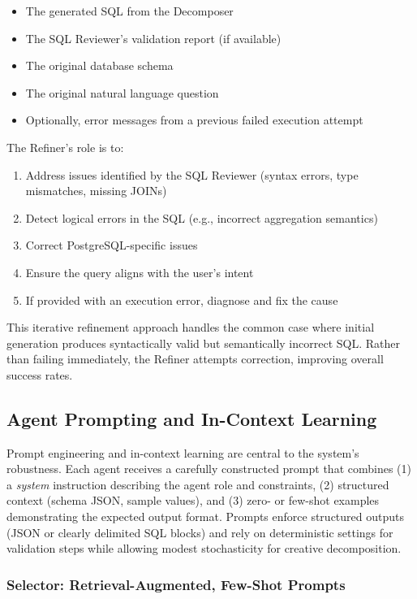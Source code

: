 \begin{itemize}
    \item The generated SQL from the Decomposer
    \item The SQL Reviewer's validation report (if available)
    \item The original database schema
    \item The original natural language question
    \item Optionally, error messages from a previous failed execution attempt
\end{itemize}

The Refiner's role is to:

\begin{enumerate}
    \item Address issues identified by the SQL Reviewer (syntax errors, type mismatches, missing JOINs)
    \item Detect logical errors in the SQL (e.g., incorrect aggregation semantics)
    \item Correct PostgreSQL-specific issues
    \item Ensure the query aligns with the user's intent
    \item If provided with an execution error, diagnose and fix the cause
\end{enumerate}

This iterative refinement approach handles the common case where initial generation produces syntactically valid but semantically incorrect SQL. Rather than failing immediately, the Refiner attempts correction, improving overall success rates.

\subsection{Agent Prompting and In-Context Learning}

Prompt engineering and in-context learning are central to the system's robustness. Each agent receives a carefully constructed prompt that combines (1) a \textit{system} instruction describing the agent role and constraints, (2) structured context (schema JSON, sample values), and (3) zero- or few-shot examples demonstrating the expected output format. Prompts enforce structured outputs (JSON or clearly delimited SQL blocks) and rely on deterministic settings for validation steps while allowing modest stochasticity for creative decomposition.

\subsubsection{Selector: Retrieval-Augmented, Few-Shot Prompts}

